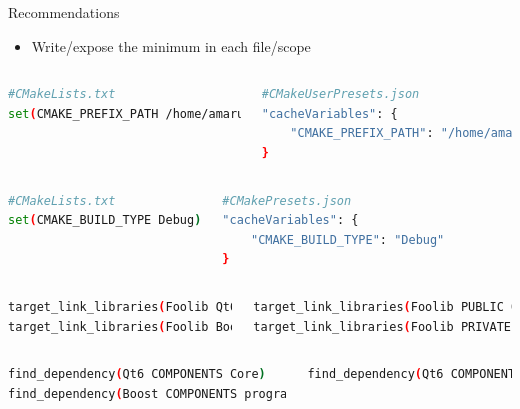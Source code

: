 \documentclass{beamer}
\begin{document}
\begin{frame}[fragile]{Recommendations}\small%
	\vspace{1cm}
	\begin{itemize}
		\item Write/expose the minimum in each file/scope
	\end{itemize}
			\begin{columns}
				\begin{lstlisting}[language=sh]
#CMakeLists.txt
set(CMAKE_PREFIX_PATH /home/amarula/Qt/6.8.0/gcc_64/)
				\end{lstlisting}%
				\begin{lstlisting}[language=sh]
#CMakeUserPresets.json
"cacheVariables": {
	"CMAKE_PREFIX_PATH": "/home/amarula/Qt/6.8.0/gcc_64/"
}
				\end{lstlisting}%
			\end{columns}
			\begin{columns}
				\column{0.5\textwidth}
				\begin{lstlisting}[language=sh]
#CMakeLists.txt
set(CMAKE_BUILD_TYPE Debug)
				\end{lstlisting}%
				\column{0.5\textwidth}
				\begin{lstlisting}[language=sh]
#CMakePresets.json
"cacheVariables": {
	"CMAKE_BUILD_TYPE": "Debug"
}
				\end{lstlisting}%
			\end{columns}
			\begin{columns}
				\begin{lstlisting}[language=sh]
target_link_libraries(Foolib Qt6::Core)
target_link_libraries(Foolib Boost::program_options)
				\end{lstlisting}%
				\begin{lstlisting}[language=sh]
target_link_libraries(Foolib PUBLIC Qt6::Core)
target_link_libraries(Foolib PRIVATE Boost::program_options)
				\end{lstlisting}%
			\end{columns}
			\begin{columns}
				\column{0.5\textwidth}
				\begin{lstlisting}[language=sh]
find_dependency(Qt6 COMPONENTS Core)
find_dependency(Boost COMPONENTS program_options)
				\end{lstlisting}%
				\column{0.5\textwidth}
				\begin{lstlisting}[language=sh]
find_dependency(Qt6 COMPONENTS Core)
				\end{lstlisting}%
			\end{columns}
\end{frame}
\end{document}
